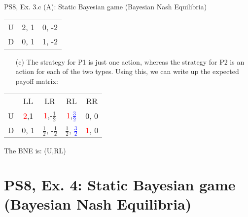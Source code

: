 \begin{frame}{PS8, Ex. 3.c (A): Static Bayesian game (Bayesian Nash Equilibria)}
\begin{multicols}{2}
\begin{table}
\begin{tabular}{l|c|c|}
          U & 2, 1 & 0, -2 \\\cline{2-3}
          D & 0, 1 & 1, -2 \\\cline{2-3}
        \end{tabular}
      \end{table}
      \vspace{-8pt}
      \begin{itemize}
          \item[(c)] The strategy for P1 is just one action, whereas the strategy for P2 is an action for each of the two types. Using this, we can write up the expected payoff matrix:
      \end{itemize}
      \vspace{-12pt}
      \begin{table}
        \begin{tabular}{l|c|c|c|c|}
          \multicolumn{1}{c}{} & \multicolumn{1}{c}{LL} & \multicolumn{1}{c}{LR} & \multicolumn{1}{c}{RL} & \multicolumn{1}{c}{RR} \\\cline{2-5}
          U & \textcolor{red}{2},1 &  \textcolor{red}{1},-$\frac{1}{2}$ & \textcolor{red}{1},\textcolor{blue}{$\frac{3}{2}$} & 0, 0  \\\cline{2-5}
          D & 0, 1  & $\frac{1}{2}$, -$\frac{1}{2}$ & $\frac{1}{2}$, \textcolor{blue}{$\frac{3}{2}$} & \textcolor{red}{1}, 0  \\\cline{2-5}
        \end{tabular}
      \end{table}
      \vspace{-4pt}
      The BNE is: (U,RL)
      \vfill\null
    \end{multicols}
\end{frame}



\section{PS8, Ex. 4: Static Bayesian game (Bayesian Nash Equilibria)}

